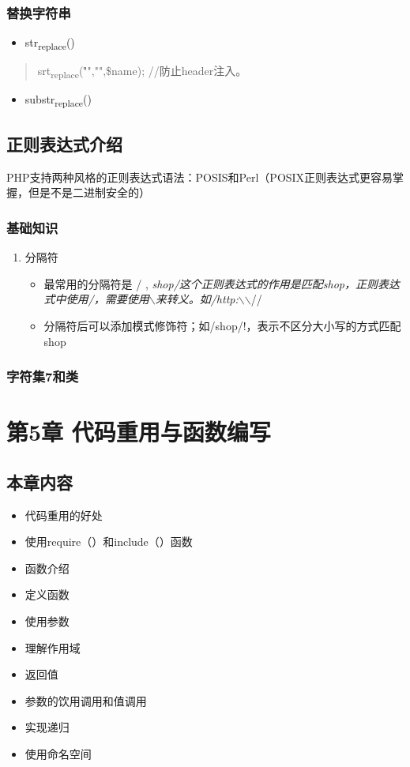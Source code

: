 \documentclass[11pt]{article}
\begin{document}
\subsubsection{替换字符串}
\label{sec:org6107c0e}
\begin{itemize}
\item str\textsubscript{replace}()
\end{itemize}
\begin{quote}
srt\textsubscript{replace}("\r\n","",\$name); //防止header注入。
\end{quote}
\begin{itemize}
\item substr\textsubscript{replace}()
\end{itemize}
\subsection{正则表达式介绍}
\label{sec:orgc2b0b75}
PHP支持两种风格的正则表达式语法：POSIS和Perl（POSIX正则表达式更容易掌
握，但是不是二进制安全的）
\subsubsection{基础知识}
\label{sec:org9635e69}
\begin{enumerate}
\item 分隔符
\label{sec:org87f5ca4}
\begin{itemize}
\item 最常用的分隔符是 / , \emph{shop/这个正则表达式的作用是匹配shop，正则表达式中使用/，需要使用$\backslash$来转义。如/http:$\backslash$}$\backslash$//
\item 分隔符后可以添加模式修饰符；如/shop/!，表示不区分大小写的方式匹配shop
\end{itemize}
\end{enumerate}
\subsubsection{字符集7和类}
\label{sec:org8f4d1dc}
\section{第5章 代码重用与函数编写}
\label{sec:org13c212a}
\subsection{本章内容}
\label{sec:orga72d337}
\begin{itemize}
\item 代码重用的好处
\item 使用require（）和include（）函数
\item 函数介绍
\item 定义函数
\item 使用参数
\item 理解作用域
\item 返回值
\item 参数的饮用调用和值调用
\item 实现递归
\item 使用命名空间
\end{itemize}
\end{document}
